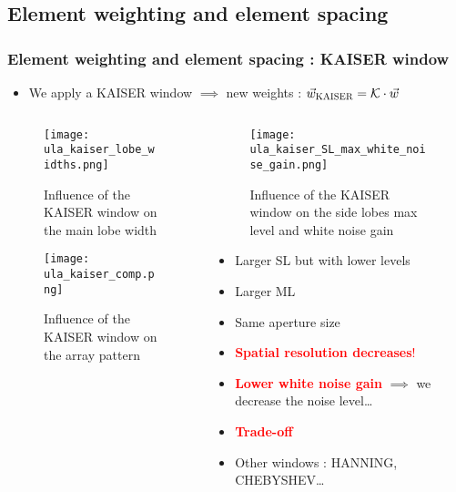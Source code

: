 \documentclass[UKenglish,8pt,aspectratio=1610]{beamer}
\begin{document}
	\subsection{Element weighting and element spacing}
	\begin{frame}
		\frametitle{Element weighting and element spacing : \textsc{KAISER} window}
		\begin{itemize}
			\item We apply a \textsc{KAISER} window $\implies$ new weights : $\vec{w}_{\textsc{KAISER}}=\mathcal{K}\cdot\vec{w}$
		\end{itemize}
	\begin{columns}
	
			\begin{column}{0.5\textwidth}
				\vspace{-15pt}
			\begin{figure}
				\texttt{[image: ula\_kaiser\_lobe\_widths.png]}
				\centering
				\vspace{-5pt}
				\caption{Influence of the \textsc{KAISER} window on the main lobe width}
			\end{figure}
		\vspace{-20pt}
		\begin{figure}
			\texttt{[image: ula\_kaiser\_comp.png]}
			\centering
			\vspace{-5pt}
			\caption{Influence of the \textsc{KAISER} window on the array pattern}
		\end{figure}
			
		\end{column}
	
		\begin{column}{0.5\textwidth}
				\vspace{-15pt}
			\begin{figure}
			\texttt{[image: ula\_kaiser\_SL\_max\_white\_noise\_gain.png]}
			\centering
			\vspace{-5pt}
			\caption{Influence of the \textsc{KAISER} window on the  side lobes max level and white noise gain}
		\end{figure}
		

\begin{itemize}
	\item Larger SL but with lower levels
	\item Larger ML
	\item Same aperture size
	\item \textcolor{red}{\textbf{Spatial resolution decreases}!}
	\item \textcolor{red}{\textbf{Lower white noise gain}} $\implies$ we decrease the noise level\dots
	\item \textcolor{red}{\textbf{Trade-off}}
	\item Other windows : \textsc{HANNING}, \textsc{CHEBYSHEV}\dots 
\end{itemize}
	\end{column}
\end{columns}

	\end{frame}
\end{document}

